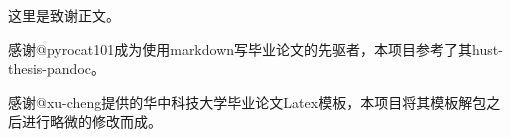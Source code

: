 \begin{ack}
这里是致谢正文。

感谢@pyrocat101成为使用markdown写毕业论文的先驱者，本项目参考了其hust-thesis-pandoc。

感谢@xu-cheng提供的华中科技大学毕业论文Latex模板，本项目将其模板解包之后进行略微的修改而成。
\end{ack}
